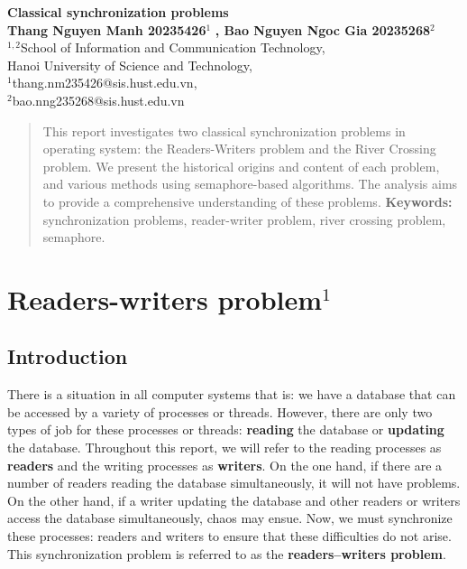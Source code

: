 \documentclass[a4paper, 10pt]{article}
\begin{document}
\begin{center}
\LARGE
\textbf{Classical synchronization
problems}
\\[6pt]
\small
\textbf {Thang Nguyen Manh 20235426}$^1$
\textbf{, Bao Nguyen Ngoc Gia 20235268}$^2$\\[6pt]
$^{1, 2}$School of Information and Communication Technology, \\
Hanoi University of Science and Technology,\\ $^1$thang.nm235426@sis.hust.edu.vn,\\
$^2$bao.nng235268@sis.hust.edu.vn
\end{center}

\begin{abstract}
This report investigates two classical synchronization problems in operating system: the Readers-Writers problem and the River Crossing problem. We present the historical origins and content of each problem, and various methods using semaphore-based algorithms. The analysis aims to provide a comprehensive understanding of these problems.
\vskip 2mm
\textbf{Keywords:}
synchronization problems, reader-writer problem, river crossing problem, semaphore.
\end{abstract}


\section{Readers-writers problem$^1$}\label{s:1}
\subsection{Introduction}
\quad There is a situation in all computer systems that is: we have a database that can be accessed by a variety of processes or threads. However, there are only two types of job for these processes or threads: \textbf{reading} the database or \textbf{updating} the database. Throughout this report, we will refer to the reading processes as \textbf{readers} and the writing processes as \textbf{writers}. On the one hand, if there are a number of readers reading the database simultaneously, it will not have problems. On the other hand, if a writer updating the database and other readers or writers access the database simultaneously, chaos may ensue. Now, we must synchronize these processes: readers and writers to ensure that these difficulties do not arise. This
synchronization problem is referred to as the \textbf{readers–writers problem}. 
\end{document}
